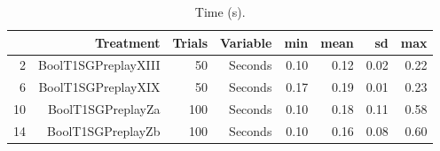 \begin{table}[ht]
\centering
\begin{tabular}{rrrrrrrr}
  \hline
 & Treatment & Trials & Variable & min & mean & sd & max \\ 
  \hline
2 & BoolT1SGPreplayXIII &  50 & Seconds & 0.10 & 0.12 & 0.02 & 0.22 \\ 
  6 & BoolT1SGPreplayXIX &  50 & Seconds & 0.17 & 0.19 & 0.01 & 0.23 \\ 
  10 & BoolT1SGPreplayZa & 100 & Seconds & 0.10 & 0.18 & 0.11 & 0.58 \\ 
  14 & BoolT1SGPreplayZb & 100 & Seconds & 0.10 & 0.16 & 0.08 & 0.60 \\ 
   \hline
\end{tabular}
\caption{Time (s).} 
\end{table}
